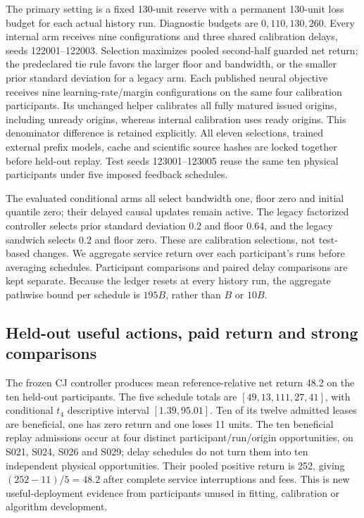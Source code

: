 \documentclass[10pt]{article}
\begin{document}
The primary setting is a fixed 130-unit reserve with a permanent 130-unit
loss budget for each actual history run. Diagnostic budgets are
$0,110,130,260$. Every internal arm receives nine configurations and three
shared calibration delays, seeds 122001--122003. Selection maximizes pooled
second-half guarded net return; the predeclared tie rule favors the larger
floor and bandwidth, or the smaller prior standard deviation for a legacy
arm. Each published neural objective receives nine learning-rate/margin
configurations on the same four calibration participants. Its unchanged
helper calibrates all fully matured issued origins, including unready
origins, whereas internal calibration uses ready origins. This denominator
difference is retained explicitly. All eleven selections, trained external
prefix models, cache and scientific source hashes are locked together
before held-out replay. Test seeds 123001--123005 reuse the same ten
physical participants under five imposed feedback schedules.

The evaluated conditional arms all select bandwidth one, floor zero and
initial quantile zero; their delayed causal updates remain active. The
legacy factorized controller selects prior standard deviation 0.2 and
floor 0.64, and the legacy sandwich selects 0.2 and floor zero. These are
calibration selections, not test-based changes. We aggregate service return
over each participant's runs before averaging schedules. Participant
comparisons and paired delay comparisons are kept separate. Because the
ledger resets at every history run, the aggregate pathwise bound per
schedule is $195B$, rather than $B$ or $10B$.


\subsection{Held-out useful actions, paid return and strong comparisons}
\label{sec:harth-outcomes}
The frozen CJ controller produces mean reference-relative net return 48.2
on the ten held-out participants. The five schedule totals are
$[49,13,111,27,41]$, with conditional $t_4$ descriptive interval
$[1.39,95.01]$. Ten of its twelve admitted leases are beneficial, one has
zero return and one loses 11 units. The ten beneficial replay admissions
occur at four distinct participant/run/origin opportunities, on S021,
S024, S026 and S029; delay schedules do not turn them into ten independent
physical opportunities. Their pooled positive return is 252, giving
$(252-11)/5=48.2$ after complete service interruptions and fees.
This is new useful-deployment evidence from participants unused in fitting,
calibration or algorithm development.
\end{document}
